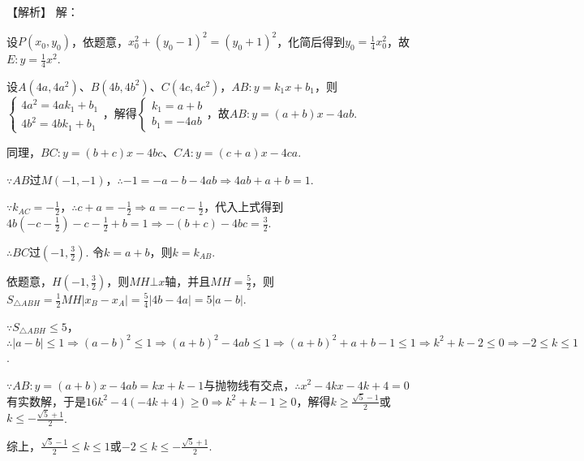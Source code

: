 \documentclass[10pt]{article}
\begin{document}
\setcounter{taskcounter}{23}
\begin{questions}{【解析】}
    \question 解：
    \begin{subquestions}
        \subquestion 设$P(x_0,y_0)$，依题意，$x_0^2+(y_0-1)^2=(y_0+1)^2$，化简后得到$y_0=\frac{1}{4}x_0^2$，故$E:y=\frac{1}{4}x^2$.
        \subquestion \begin{subsubquestions}
            \subsubquestion 设$A(4a,4a^2)$、$B(4b,4b^2)$、$C(4c,4c^2)$，$AB:y=k_1x+b_1$，则$\begin{cases}
                4a^2 = 4ak_1+b_1 \\
                4b^2 = 4bk_1+b_1
            \end{cases}$，解得$\begin{cases}
                k_1 = a+b \\
                b_1 = -4ab
            \end{cases}$，故$AB:y=(a+b)x-4ab$. \par
            同理，$BC:y=(b+c)x-4bc$、$CA:y=(c+a)x-4ca$. \par
            $\because AB$过$M(-1,-1)$，$\therefore -1=-a-b-4ab \Rightarrow 4ab+a+b=1$. \par
            $\because k_{AC}=-\frac{1}{2}$，$\therefore c+a=-\frac{1}{2} \Rightarrow a=-c-\frac{1}{2}$，代入上式得到$4b(-c-\frac{1}{2})-c-\frac{1}{2}+b=1 \Rightarrow -(b+c)-4bc=\frac{3}{2}$. \par
            $\therefore BC$过$(-1,\frac{3}{2})$.
            \subsubquestion 令$k=a+b$，则$k=k_{AB}$. \par
            依题意，$H(-1,\frac{3}{2})$，则$MH \bot x\text{轴}$，并且$MH=\frac{5}{2}$，则$S_{\triangle ABH}=\frac{1}{2}MH|x_B-x_A|=\frac{5}{4}|4b-4a|=5|a-b|$. \par
            $\because S_{\triangle ABH} \leq 5$，$\therefore |a-b| \leq 1 \Rightarrow (a-b)^2 \leq 1 \Rightarrow (a+b)^2-4ab \leq 1 \Rightarrow (a+b)^2+a+b-1 \leq 1 \Rightarrow k^2+k-2 \leq 0 \Rightarrow -2 \leq k \leq 1$. \par
            $\because AB:y=(a+b)x-4ab=kx+k-1$与抛物线有交点，$\therefore x^2-4kx-4k+4=0$有实数解，于是$16k^2-4(-4k+4) \geq 0 \Rightarrow k^2+k-1 \geq 0$，解得$k \geq \frac{\sqrt{5}-1}{2}$或$k \leq -\frac{\sqrt{5}+1}{2}$. \par
            综上，$\frac{\sqrt{5}-1}{2} \leq k \leq 1$或$-2 \leq k \leq -\frac{\sqrt{5}+1}{2}$.
        \end{subsubquestions}
    \end{subquestions}
\end{questions}
\end{document}
